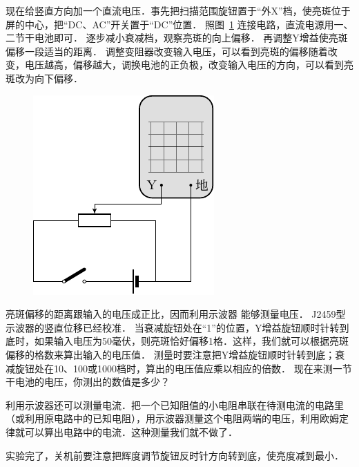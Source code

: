 现在给竖直方向加一个直流电压．事先把扫描范围旋钮置于“外X”档，使亮斑位于屏的中心，把“DC、AC”开关置于“DC”位置．
照图~\ref{fig_B_9-14} 连接电路，直流电源用一、二节干电池即可．
逐步减小衰减档，观察亮斑的向上偏移．
再调整Y增益使亮斑偏移一段适当的距离．
调整变阻器改变输入电压，可以看到亮斑的偏移随着改变，电压越高，偏移越大，调换电池的正负极，改变输入电压的方向，可以看到亮斑改为向下偏移．
\begin{figure}[htbp]
    \centering
    \includegraphics{fig/B/9-14.pdf}
    \caption{}\label{fig_B_9-14}
\end{figure}

亮斑偏移的距离跟输入的电压成正比，因而利用示波器
能够测量电压．
J2459型示波器的竖直位移已经校准．
当衰减旋钮处在“1”的位置，Y增益旋钮顺时针转到底时，如果输入电压为50毫伏，则亮斑恰好偏移1格．这样，我们就可以根据亮斑偏移的格数来算出输入的电压值．
测量时要注意把Y增益旋钮顺时针转到底；衰减旋钮处在10、100或1000档时，算出的电压值应乘以相应的倍数．
现在来测一节干电池的电压，你测出的数值是多少？

利用示波器还可以测量电流．把一个已知阻值的小电阻串联在待测电流的电路里（或利用原电路中的已知电阻），用示波器测量这个电阻两端的电压，利用欧姆定律就可以算出电路中的电流．这种测量我们就不做了．

实验完了，关机前要注意把辉度调节旋钮反时针方向转到底，使亮度减到最小．

